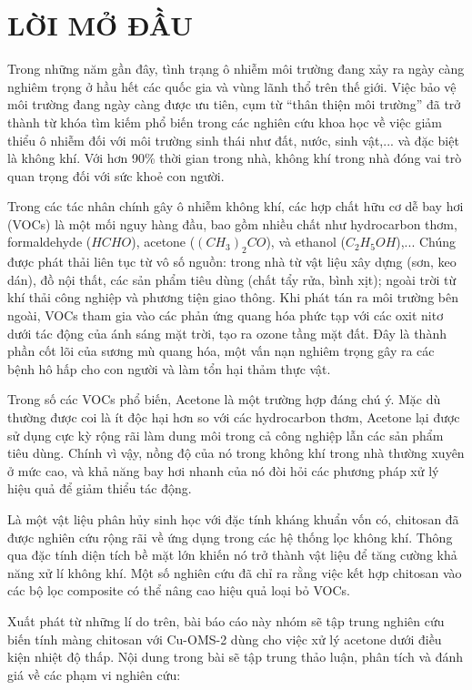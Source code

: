 \documentclass{article} %
\begin{document}
\cleardoublepage    
\section*{LỜI MỞ ĐẦU}
 {}
\setcounter{section}{1}

Trong những năm gần đây, tình trạng ô nhiễm môi trường đang xảy ra ngày càng nghiêm trọng ở hầu hết các quốc gia và vùng lãnh thổ trên thế giới. Việc bảo vệ môi trường đang ngày càng được ưu tiên, cụm từ “thân thiện môi trường” đã trở thành từ khóa tìm kiếm phổ biến trong các nghiên cứu khoa học về việc giảm thiểu ô nhiễm đối với môi trường sinh thái như đất, nước, sinh vật,... và đặc biệt là không khí. Với hơn 90\% thời gian trong nhà, không khí trong nhà đóng vai trò quan trọng đối với sức khoẻ con người. 

Trong các tác nhân chính gây ô nhiễm không khí, các hợp chất hữu cơ dễ bay hơi (VOCs) là một mối nguy hàng đầu, bao gồm nhiều chất như hydrocarbon thơm, formaldehyde ($HCHO$), acetone ($(CH_3)_2CO$), và ethanol ($C_2H_5OH$),... Chúng được phát thải liên tục từ vô số nguồn: trong nhà từ vật liệu xây dựng (sơn, keo dán), đồ nội thất, các sản phẩm tiêu dùng (chất tẩy rửa, bình xịt); ngoài trời từ khí thải công nghiệp và phương tiện giao thông. Khi phát tán ra môi trường bên ngoài, VOCs tham gia vào các phản ứng quang hóa phức tạp với các oxit nitơ dưới tác động của ánh sáng mặt trời, tạo ra ozone tầng mặt đất. Đây là thành phần cốt lõi của sương mù quang hóa, một vấn nạn nghiêm trọng gây ra các bệnh hô hấp cho con người và làm tổn hại thảm thực vật. 

Trong số các VOCs phổ biến, Acetone là một trường hợp đáng chú ý. Mặc dù thường được coi là ít độc hại hơn so với các hydrocarbon thơm, Acetone lại được sử dụng cực kỳ rộng rãi làm dung môi trong cả công nghiệp lẫn các sản phẩm tiêu dùng. Chính vì vậy, nồng độ của nó trong không khí trong nhà thường xuyên ở mức cao, và khả năng bay hơi nhanh của nó đòi hỏi các phương pháp xử lý hiệu quả để giảm thiểu tác động.

Là một vật liệu phân hủy sinh học với đặc tính kháng khuẩn vốn có, chitosan đã được nghiên cứu rộng rãi về ứng dụng trong các hệ thống lọc không khí. Thông qua đặc tính diện tích bề mặt lớn khiến nó trở thành vật liệu để tăng cường khả năng xử lí không khí. Một số nghiên cứu đã chỉ ra rằng việc kết hợp chitosan vào các bộ lọc composite có thể nâng cao hiệu quả loại bỏ VOCs.

Xuất phát từ những lí do trên, bài báo cáo này nhóm sẽ tập trung nghiên cứu biến tính màng chitosan với Cu-OMS-2 dùng cho việc xử lý acetone dưới điều kiện nhiệt độ thấp. Nội dung trong bài sẽ tập trung thảo luận, phân tích và đánh giá về các phạm vi nghiên cứu:
\end{document}
